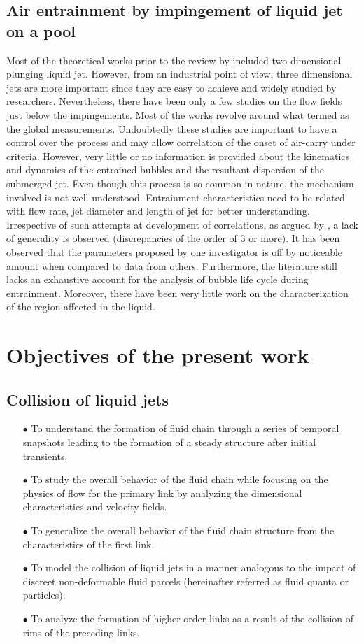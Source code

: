 \subsection{Air entrainment by impingement of liquid jet on a pool}
Most of the theoretical works prior to the review by \citet{Bin1993} included two-dimensional plunging liquid jet. However, from an industrial point of view, three dimensional jets are more important since they are easy to achieve and widely studied by researchers. Nevertheless, there have been only a few studies on the flow fields just below the impingements. Most of the works revolve around what \citet{Bonetto1993} termed as the global measurements. Undoubtedly these studies are important to have a control over the process and may allow correlation of the onset of air-carry under criteria. However, very little or no information is provided about the kinematics and dynamics of the entrained bubbles and the resultant dispersion of the submerged jet. Even though this process is so common in nature, the mechanism involved is not well understood. Entrainment characteristics need to be related with flow rate, jet diameter and length of jet for better understanding. Irrespective of such attempts at development of correlations, as argued by \citet{Van1976}, a lack of generality is observed (discrepancies of the order of 3 or more). It has been observed that the parameters proposed by one investigator is off by noticeable amount when compared to data from others. Furthermore, the literature still lacks an exhaustive account for the analysis of bubble life cycle during entrainment. Moreover, there have been very little work on the characterization of the region affected in the liquid.
\section{Objectives of the present work}
\subsection{Collision of liquid jets}
\begin{enumerate}
\item [$\bullet$] To understand the formation of fluid chain through a series of temporal snapshots leading to the formation of a steady structure after initial transients.
\item [$\bullet$] To study the overall behavior of the fluid chain while focusing on the physics of flow for the primary link by analyzing the dimensional characteristics and velocity fields.
\item [$\bullet$] To generalize the overall behavior of the fluid chain structure from the characteristics of the first link.
\item [$\bullet$] To model the collision of liquid jets in a manner analogous to the impact of discreet non-deformable fluid parcels (hereinafter referred as fluid quanta or particles). 
\item [$\bullet$] To analyze the formation of higher order links as a result of the collision of rims of the preceding links. 
\end{enumerate}
